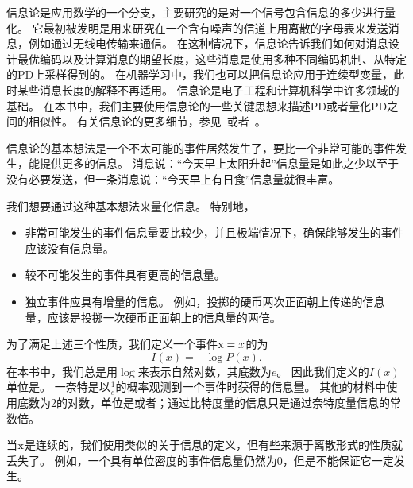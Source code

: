 信息论是应用数学的一个分支，主要研究的是对一个信号包含信息的多少进行量化。
它最初被发明是用来研究在一个含有噪声的信道上用离散的字母表来发送消息，例如通过无线电传输来通信。
在这种情况下，信息论告诉我们如何对消息设计最优编码以及计算消息的期望长度，这些消息是使用多种不同编码机制、从特定的\gls{PD}上采样得到的。
在机器学习中，我们也可以把信息论应用于连续型变量，此时某些消息长度的解释不再适用。
信息论是电子工程和计算机科学中许多领域的基础。
在本书中，我们主要使用信息论的一些关键思想来描述\gls{PD}或者量化\gls{PD}之间的相似性。
有关信息论的更多细节，参见~\cite{cover-book2006}或者~\cite{MacKay03}。

信息论的基本想法是一个不太可能的事件居然发生了，要比一个非常可能的事件发生，能提供更多的信息。
消息说：``今天早上太阳升起''信息量是如此之少以至于没有必要发送，但一条消息说：``今天早上有日食''信息量就很丰富。


我们想要通过这种基本想法来量化信息。
特别地，
\begin{itemize}
\item 非常可能发生的事件信息量要比较少，并且极端情况下，确保能够发生的事件应该没有信息量。

\item 较不可能发生的事件具有更高的信息量。

\item 独立事件应具有增量的信息。
例如，投掷的硬币两次正面朝上传递的信息量，应该是投掷一次硬币正面朝上的信息量的两倍。
\end{itemize}

为了满足上述三个性质，我们定义一个事件$\mathrm{x} = x$的为
\begin{equation}
I(x) = -\log P(x).
\end{equation}
在本书中，我们总是用$\log$来表示自然对数，其底数为$e$。
因此我们定义的$I(x)$单位是。
一奈特是以$\frac{1}{e}$的概率观测到一个事件时获得的信息量。
其他的材料中使用底数为2的对数，单位是或者；通过比特度量的信息只是通过奈特度量信息的常数倍。

当$\mathrm{x}$是连续的，我们使用类似的关于信息的定义，但有些来源于离散形式的性质就丢失了。
例如，一个具有单位密度的事件信息量仍然为0，但是不能保证它一定发生。


